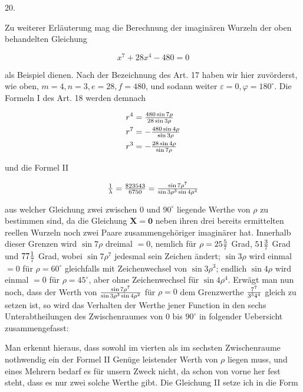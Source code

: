 \documentclass[twoside,12pt, showframe]{memoir}
\let\oldfrac\frac
\def\frac#1#2{\mathchoice{\tfrac{#1}{#2}}{\oldfrac{#1}{#2}}{\genfrac{}{}{}{2}{#1}{#2\mathstrut}}{\genfrac{}{}{}{3}{#1}{#2\mathstrut}}}
\begin{document}
20.

Zu weiterer Erläuterung mag die Berechnung der imaginären Wurzeln der oben behandelten Gleichung

\[
x^{7}+28 x^{4}-480=0
\]

als Beispiel dienen. Nach der Bezeichnung des Art. 17 haben wir hier zuvörderst, wie oben, \(m=4, n=3, e=28, f=480\), und sodann weiter \(\varepsilon=0, \varphi=180^{\circ}\). Die Formeln I des Art. 18 werden demnach

\[
\begin{aligned}
& r^{4}=\frac{480 \sin 7 \rho}{28 \sin 3 \rho} \\
& r^{7}=-\frac{480 \sin 4 \rho}{\sin 3 \rho} \\
& r^{3}=-\frac{28 \sin 4 \rho}{\sin 7 \rho}
\end{aligned}
\]

und die Formel II

\[
\frac{1}{\lambda}=\frac{\$ 23543}{6750}=\frac{\sin 7 \rho^{7}}{\sin 3 \rho^{3} \sin 4 \rho^{4}}
\]

aus welcher Gleichung zwei zwischen 0 und \(90^{\circ}\) liegende Werthe von \(\rho\) zu bestimmen sind, da die Gleichung \(\boldsymbol{X}=\mathbf{0}\) neben ihren drei bereits ermittelten reellen Wurzeln noch zwei Paare zusammengehöriger imaginärer hat. Innerhalb dieser Grenzen wird \(\sin 7 \rho\) dreimal \(=0\), nemlich für \(\rho=25 \frac{5}{7}\) Grad, \(51 \frac{3}{7}\) Grad und \(77 \frac{1}{7}\) Grad, wobei \(\sin 7 \rho^{7}\) jedesmal sein Zeichen ändert; \(\sin 3 \rho\) wird einmal \(=0\) für \(\rho=60^{\circ}\) gleichfalls mit Zeichenwechsel von \(\sin 3 \rho^{3}\); endlich \(\sin 4 \rho\) wird einmal \(=0\) für \(\rho=45^{\circ}\), aber ohne Zeichenwechsel für \(\sin 4 \rho^{4}\). Erwägt man nun noch, dass der Werth von \(\frac{\sin 7 \rho^{7}}{\sin 3 \rho^{3} \sin 4 \rho^{2}}\) für \(\rho=0\) dem Grenzwerthe \(\frac{7^{7}}{3^{3} 4^{4}}\) gleich zu setzen ist, so wird das Verhalten der Werthe jener Function in den sechs Unterabtheilungen des Zwischenraumes von 0 bis \(90^{\circ}\) in folgender Uebersicht zusammengefasst:

\begin{center}
\end{center}

Man erkennt hieraus, dass sowohl im vierten als im sechsten Zwischenraume nothwendig ein der Formel II Genüge leistender Werth von \(\rho\) liegen muss, und eines Mehrern bedarf es für unsern Zweck nicht, da schon von vorne her fest steht, dass es nur zwei solche Werthe gibt. Die Gleichung II setze ich in die Form
\end{document}
